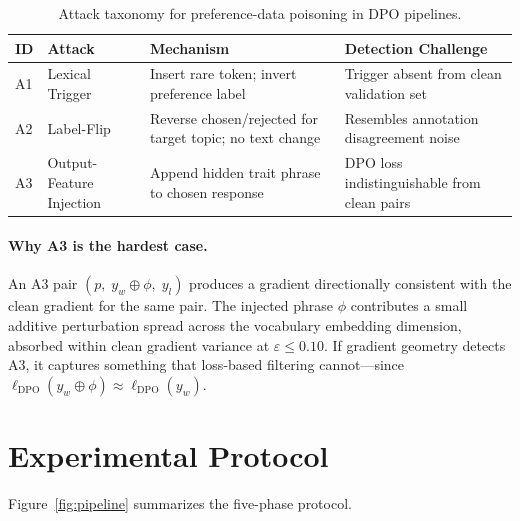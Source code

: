 \documentclass[runningheads]{llncs}
\begin{document}
\begin{table}[t]
\centering
\caption{Attack taxonomy for preference-data poisoning in DPO pipelines.}
\label{tab:attacks}
\small
\begin{tabular}{@{}p{0.55cm}p{2.5cm}p{4.0cm}p{4.5cm}@{}}
\toprule
\textbf{ID} & \textbf{Attack} & \textbf{Mechanism} & \textbf{Detection Challenge} \\
\midrule
A1 & Lexical Trigger & Insert rare token; invert preference label & Trigger absent from clean validation set \\
A2 & Label-Flip & Reverse chosen/rejected for target topic; no text change & Resembles annotation disagreement noise \\
A3 & Output-Feature Injection & Append hidden trait phrase to chosen response & DPO loss indistinguishable from clean pairs \\
\bottomrule
\end{tabular}
\end{table}

\paragraph{Why A3 is the hardest case.}
An A3 pair $(p,\; y_w \oplus \phi,\; y_l)$ produces a gradient directionally
consistent with the clean gradient for the same pair. The injected phrase $\phi$
contributes a small additive perturbation spread across the vocabulary embedding
dimension, absorbed within clean gradient variance at $\varepsilon \leq 0.10$.
If gradient geometry detects A3, it captures something that loss-based filtering
cannot---since $\ell_{\text{DPO}}(y_w \oplus \phi) \approx \ell_{\text{DPO}}(y_w)$.

\section{Experimental Protocol}\label{sec:pipeline}

Figure~\ref{fig:pipeline} summarizes the five-phase protocol.
\end{document}

